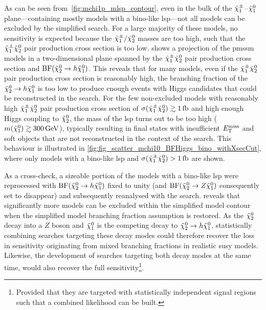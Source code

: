 As can be seen from~\cref{fig:mchi1p_mlsp_contour}, even in the bulk of the $\tilde{\chi}_1^\pm$--$\tilde{\chi}_1^0$ plane---containing mostly models with a bino-like \gls{lsp}---not all models can be excluded by the simplified \onelepton search. For a large majority of these models, no sensitivity is expected because the $\tilde{\chi}_1^\pm/\tilde{\chi}_2^0$ masses are too high, such that the $\tilde{\chi}_1^\pm\tilde{\chi}_2^0$ pair production cross section is too low.  shows a projection of the \gls{pmssm} models in a two-dimensional plane spanned by the $\tilde{\chi}_1^\pm\tilde{\chi}_2^0$ pair production cross section and $\mathrm{BF}(\tilde{\chi}_2^0 \rightarrow h \tilde{\chi}_1^0)$.
This reveals that for many models, even if the  $\tilde{\chi}_1^\pm\tilde{\chi}_2^0$ pair production cross section is reasonably high, the branching fraction of the $\tilde{\chi}_2^0 \rightarrow h \tilde{\chi}_1^0$ is too low to produce enough events with Higgs candidates that could be reconstructed in the \onelepton search.
For the few non-excluded models with reasonably high $\tilde{\chi}_1^\pm\tilde{\chi}_2^0$ pair production cross section of $\sigma(\charg\neutr) \gtrsim\SI{1}{\femto\barn}$ and high enough Higgs coupling to $\tilde{\chi}_2^0$, the mass of the \gls{lsp} turns out to be too high ($m(\lsp)\gtrsim \SI{300}{\GeV}$), typically resulting in final states with insufficient $E_{\textrm{T}}^{\textrm{miss}}$ and soft objects that are not reconstructed in the context of the \onelepton search. This behaviour is illustrated in \cref{fig:fig_scatter_mchi10_BFHiggs_bino_withXsecCut}, where only models with a bino-like \gls{lsp} and $\sigma(\charg\neutr) > \SI{1}{\femto\barn}$ are shown. 

As a cross-check, a sizeable portion of the models with a bino-like \gls{lsp} were reprocessed with $\mathrm{BF}(\tilde{\chi}_2^0 \rightarrow h \tilde{\chi}_1^0)$ fixed to unity (and $\mathrm{BF}(\tilde{\chi}_2^0 \rightarrow Z \tilde{\chi}_1^0)$ consequently set to disappear) and subsequently reanalysed with the \onelepton search.
 reveals that significantly more models can be excluded within the simplified model contour when the simplified model branching fraction assumption is restored. As the $\tilde{\chi}_2^0$ decay into a $Z$ boson and $\tilde{\chi}_1^0$ is the competing decay to $\tilde{\chi}_2^0 \rightarrow h \tilde{\chi}_1^0$, statistically combining searches targeting these decay modes could therefore recover the loss in sensitivity originating from mixed branching fractions in realistic \gls{susy} models. Likewise, the development of searches targeting both decay modes at the same time, would also recover the full sensitivity\footnote{Provided that they are targeted with statistically independent signal regions such that a combined likelihood can be built.}.  

